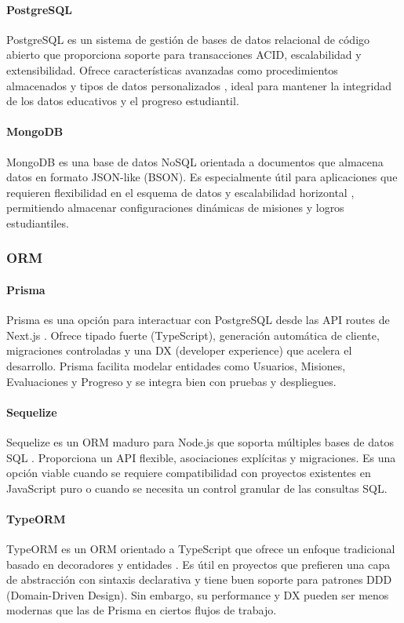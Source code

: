 \paragraph{PostgreSQL}
PostgreSQL es un sistema de gestión de bases de datos relacional de código abierto que proporciona soporte para transacciones ACID, escalabilidad y extensibilidad. Ofrece características avanzadas como procedimientos almacenados y tipos de datos personalizados \cite{postgresql2024}, ideal para mantener la integridad de los datos educativos y el progreso estudiantil.

\paragraph{MongoDB}
MongoDB es una base de datos NoSQL orientada a documentos que almacena datos en formato JSON-like (BSON). Es especialmente útil para aplicaciones que requieren flexibilidad en el esquema de datos y escalabilidad horizontal \cite{mongodb2023}, permitiendo almacenar configuraciones dinámicas de misiones y logros estudiantiles.

\subsubsection{ORM}
\paragraph{Prisma}
Prisma es una opción  para interactuar con PostgreSQL desde las API routes de Next.js \cite{prisma_docs2024}. Ofrece tipado fuerte (TypeScript), generación automática de cliente, migraciones controladas y una DX (developer experience) que acelera el desarrollo. Prisma facilita modelar entidades como Usuarios, Misiones, Evaluaciones y Progreso y se integra bien con pruebas y despliegues.

\paragraph{Sequelize}
Sequelize es un ORM maduro para Node.js que soporta múltiples bases de datos SQL \cite{sequelize_docs2023}. Proporciona un API flexible, asociaciones explícitas y migraciones. Es una opción viable cuando se requiere compatibilidad con proyectos existentes en JavaScript puro o cuando se necesita un control granular de las consultas SQL.

\paragraph{TypeORM}
TypeORM es un ORM orientado a TypeScript que ofrece un enfoque tradicional basado en decoradores y entidades \cite{typeorm_docs2022}. Es útil en proyectos que prefieren una capa de abstracción con sintaxis declarativa y tiene buen soporte para patrones DDD (Domain-Driven Design). Sin embargo, su performance y DX pueden ser menos modernas que las de Prisma en ciertos flujos de trabajo.


